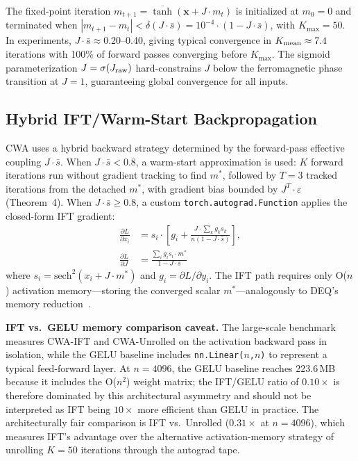 \documentclass[11pt,twocolumn,letterpaper]{article}
\begin{document}
The fixed-point iteration $m_{t+1} = \overline{\tanh}(\mathbf{x} + J\cdot m_t)$ is initialized at $m_0 = 0$ and
terminated when $|m_{t+1} - m_t| < \delta(J\cdot\bar{s}) = 10^{-4}\cdot(1 - J\cdot\bar{s})$, with $K_{\max} = 50$. In
experiments, $J\cdot\bar{s} \approx 0.20$--$0.40$, giving typical convergence in $K_{\rm mean} \approx 7.4$ iterations
with 100\% of forward passes converging before $K_{\max}$. The sigmoid parameterization $J = \sigma(J_{\rm raw})$
hard-constrains $J$ below the ferromagnetic phase transition at $J = 1$, guaranteeing global convergence for all inputs.

\subsection{Hybrid IFT/Warm-Start Backpropagation}
\label{sec:ift}

CWA uses a hybrid backward strategy determined by the forward-pass effective coupling $J\cdot\bar{s}$. When
$J\cdot\bar{s} < 0.8$, a warm-start approximation is used: $K$ forward iterations run without gradient tracking to find
$m^*$, followed by $T = 3$ tracked iterations from the detached $m^*$, with gradient bias bounded by $J^T \cdot \varepsilon$
(Theorem~4). When $J\cdot\bar{s} \geq 0.8$, a custom \texttt{torch.autograd.Function} applies the closed-form IFT
gradient:
\begin{align}
  \frac{\partial L}{\partial x_i} &= s_i\cdot\left[g_i + \frac{J\cdot\sum_k g_k s_k}{n(1 - J\cdot\bar{s})}\right], \\
  \frac{\partial L}{\partial J} &= \frac{\sum_i g_i s_i \cdot m^*}{1 - J\cdot\bar{s}}
\end{align}
where $s_i = \text{sech}^2(x_i + J\cdot m^*)$ and $g_i = \partial L/\partial y_i$. The IFT path requires only O($n$)
activation memory---storing the converged scalar $m^*$---analogously to DEQ's memory reduction~\cite{Bai2019}.

\textbf{IFT vs.\ GELU memory comparison caveat.} The large-scale benchmark measures CWA-IFT and CWA-Unrolled on the
activation backward pass in isolation, while the GELU baseline includes \texttt{nn.Linear($n$,$n$)} to represent a typical
feed-forward layer. At $n=4096$, the GELU baseline reaches 223.6\,MB because it includes the O($n^2$) weight matrix; the
IFT/GELU ratio of $0.10\times$ is therefore dominated by this architectural asymmetry and should not be interpreted as IFT
being $10\times$ more efficient than GELU in practice. The architecturally fair comparison is IFT vs.\ Unrolled
($0.31\times$ at $n=4096$), which measures IFT's advantage over the alternative activation-memory strategy of unrolling
$K=50$ iterations through the autograd tape.
\end{document}
